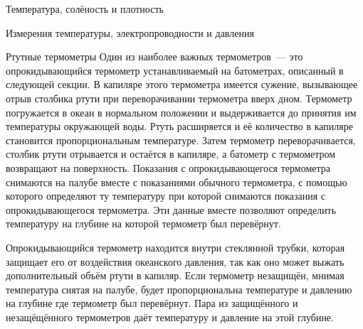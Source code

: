 \begin{chapter}{Температура, солёность и плотность}
\begin{section}{Измерения температуры, электропроводности и давления}
\begin{paragraph}{Ртутные термометры}
Один из наиболее важных термометров~--- это опрокидывающийся
термометр устанавливаемый на батометрах, описанный в следующей
секции. В капиляре этого термометра имеется сужение, вызывающее отрыв
столбика ртути при переворачивании термометра вверх дном. Термометр
погружается в океан в нормальном положении и выдерживается до принятия
им температуры окружающей воды. Ртуть расширяется и её количество в
капиляре становится пропорциональным температуре. Затем термометр
переворачивается, столбик ртути отрывается и остаётся в капиляре, а
батометр с термометром возвращают на поверхность. Показания с
опрокидывающегося термометра снимаются на палубе вместе с показаниями
обычного термометра, с помощью которого определяют ту температуру при
которой снимаются показания с опрокидывающегося термометра. Эти данные
вместе позволяют определить температуру на глубине на которой
термометр был перевёрнут.
%


Опрокидывающийся термометр находится внутри стеклянной трубки, которая
защищает его от воздействия океанского давления, так как оно может
выжать дополнительный объём ртути в капиляр. Если термометр незащищён,
мнимая температура снятая на палубе, будет пропорциональна температуре
и давлению на глубине где термометр был перевёрнут. Пара из
защищённого и незащёщённого термометров даёт температуру и давление на
этой глубине.
%


\end{paragraph}
\end{section}
\end{chapter}
